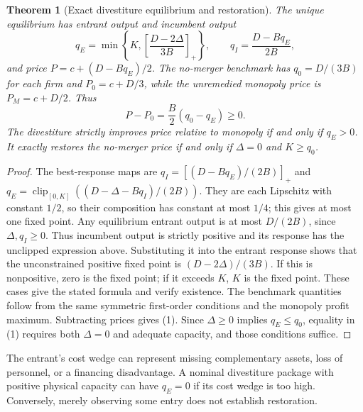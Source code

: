 \documentclass[11pt]{article}
\newtheorem{theorem}{Theorem}
\theoremstyle{remark}\newtheorem{remark}[theorem]{Remark}
\newcommand{\clip}{\operatorname{clip}}
\begin{document}
\begin{theorem}[Exact divestiture equilibrium and restoration]
The unique equilibrium has entrant output and incumbent output
\[
 q_E=\min\left\{K,\left[\frac{D-2\Delta}{3B}\right]_+\right\},
 \qquad q_I=\frac{D-Bq_E}{2B},
\]
and price $P=c+(D-Bq_E)/2$. The no-merger benchmark has $q_0=D/(3B)$ for each firm and $P_0=c+D/3$, while the unremedied monopoly price is $P_M=c+D/2$. Thus
\[
 P-P_0=\frac B2(q_0-q_E)\ge0.
 \tag{1}
\]
The divestiture strictly improves price relative to monopoly if and only if $q_E>0$. It exactly restores the no-merger price if and only if $\Delta=0$ and $K\ge q_0$.
\end{theorem}
\begin{proof}
The best-response maps are $q_I=[(D-Bq_E)/(2B)]_+$ and $q_E=\clip_{[0,K]}((D-\Delta-Bq_I)/(2B))$. They are each Lipschitz with constant $1/2$, so their composition has constant at most $1/4$; this gives at most one fixed point. Any equilibrium entrant output is at most $D/(2B)$, since $\Delta,q_I\ge0$. Thus incumbent output is strictly positive and its response has the unclipped expression above. Substituting it into the entrant response shows that the unconstrained positive fixed point is $(D-2\Delta)/(3B)$. If this is nonpositive, zero is the fixed point; if it exceeds $K$, $K$ is the fixed point. These cases give the stated formula and verify existence. The benchmark quantities follow from the same symmetric first-order conditions and the monopoly profit maximum. Subtracting prices gives (1). Since $\Delta\ge0$ implies $q_E\le q_0$, equality in (1) requires both $\Delta=0$ and adequate capacity, and those conditions suffice.
\end{proof}

The entrant's cost wedge can represent missing complementary assets, loss of personnel, or a financing disadvantage. A nominal divestiture package with positive physical capacity can have $q_E=0$ if its cost wedge is too high. Conversely, merely observing some entry does not establish restoration.
\end{document}
